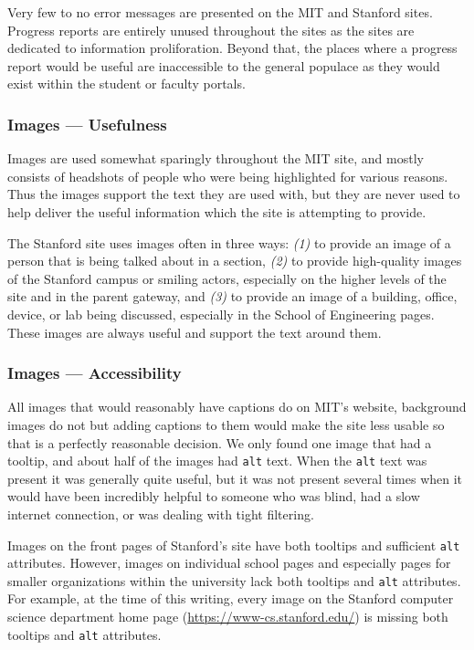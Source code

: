 Very few to no error messages are presented on the MIT and Stanford sites.
Progress reports are entirely unused throughout the sites as the sites are dedicated to
information proliforation. Beyond that, the places where a progress report would be
useful are inaccessible to the general populace as they would exist within the student or
faculty portals.

\subsubsection*{Images --- Usefulness}

Images are used somewhat sparingly throughout the MIT site, and mostly consists of headshots of people who were
being highlighted for various reasons. Thus the images support the text they are used
with, but they are never used to help deliver the useful information which the site
is attempting to provide.

The Stanford site uses images often in three ways: \textit{(1)} to provide an image
of a person that is being talked about in a section, \textit{(2)} to provide high-quality
images of the Stanford campus or smiling actors, especially on the higher levels of
the site and in the parent gateway, and \textit{(3)} to provide an image of a building,
office, device, or lab being discussed, especially in the School of Engineering
pages. These images are always useful and support the text around them.

\subsubsection*{Images --- Accessibility}

All images that would reasonably have captions do on MIT's website, background images do not but
adding captions to them would make the site less usable so that is a perfectly reasonable
decision. We only found one image that had a tooltip, and
about half of the images had \texttt{alt} text. When the \texttt{alt} text was present it was generally quite
useful, but it was not present several times when it would have been incredibly helpful to
someone who was blind, had a slow internet connection, or was dealing with tight filtering.

Images on the front pages of Stanford's site have both tooltips and sufficient
\texttt{alt} attributes. However, images on individual school pages and especially
pages for smaller organizations within the university lack both tooltips and
\texttt{alt} attributes. For example, at the time of this writing, every image
on the Stanford computer science department home page (\url{https://www-cs.stanford.edu/})
is missing both tooltips and \texttt{alt} attributes.

